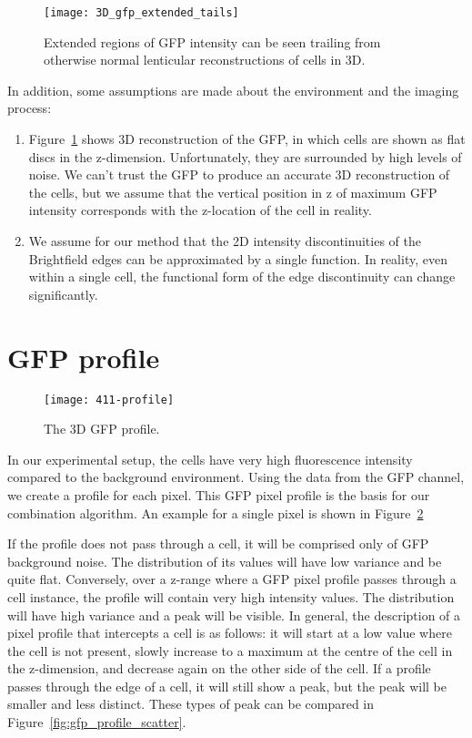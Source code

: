 \begin{figure}[htbp!]
\centering
\texttt{[image: 3D\_gfp\_extended\_tails]}
\caption[GFP 3D reconstruction]{Extended regions of GFP intensity can be seen trailing from otherwise normal lenticular reconstructions of cells in 3D.}
\label{fig:gfp_3d_recon}
\end{figure}

In addition, some assumptions are made about the environment and the imaging process:
\begin{enumerate}
\item Figure~\ref{fig:gfp_3d_recon} shows 3D reconstruction of the GFP, in which cells are shown as flat discs in the z-dimension. Unfortunately, they are surrounded by high levels of noise. We can't trust the GFP to produce an accurate 3D reconstruction of the cells, but we assume that the vertical position in z of maximum GFP intensity corresponds with the z-location of the cell in reality.
\item We assume for our method that the 2D intensity discontinuities of the Brightfield edges can be approximated by a single function. In reality, even within a single cell, the functional form of the edge discontinuity can change significantly.
\end{enumerate}

\section{GFP profile}

\begin{figure}[htbp!]
\centering
\texttt{[image: 411-profile]}
\caption[GFP profile]{The 3D GFP profile.}
\label{fig:3D_gfp_profile}
\end{figure}

In our experimental setup, the cells have very high fluorescence intensity compared to the background environment. Using the data from the GFP channel, we create a profile for each pixel. This GFP pixel profile is the basis for our combination algorithm. An example for a single pixel is shown in Figure~\ref{fig:3D_gfp_profile}

If the profile does not pass through a cell, it will be comprised only of GFP background noise. The distribution of its values will have low variance and be quite flat. Conversely, over a z-range where a GFP pixel profile passes through a cell instance, the profile will contain very high intensity values. The distribution will have high variance and a peak will be visible. In general, the description of a pixel profile that intercepts a cell is as follows: it will start at a low value where the cell is not present, slowly increase to a maximum at the centre of the cell in the z-dimension, and decrease again on the other side of the cell. If a profile passes through the edge of a cell, it will still show a peak, but the peak will be smaller and less distinct. These types of peak can be compared in Figure~\ref{fig:gfp_profile_scatter}.

